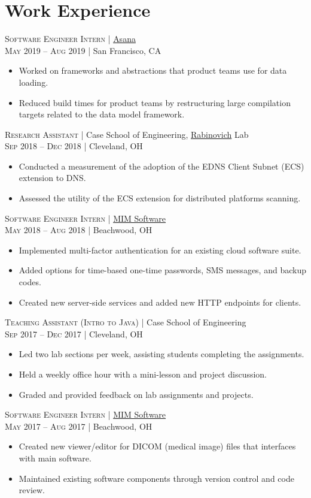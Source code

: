 \documentclass[a4paper,11pt]{article}
\begin{document}
\section{Work Experience}
\textsc{Software Engineer Intern} | \href{https://asana.com}{Asana} \\
\textsc{May 2019 – Aug 2019} | San Francisco, CA
\begin{itemize}
	\item Worked on frameworks and abstractions that product teams use for data loading.
	\item Reduced build times for product teams by restructuring large compilation targets related to the data model framework.
\end{itemize}
\vskip 2mm
\textsc{Research Assistant} | Case School of Engineering, \href{http://engr.case.edu/rabinovich_michael/}{Rabinovich} Lab \\
\textsc{Sep 2018 – Dec 2018} | Cleveland, OH
\begin{itemize}
	\item Conducted a measurement of the adoption of the EDNS Client Subnet (ECS) extension to DNS.
	\item Assessed the utility of the ECS extension for distributed platforms scanning.
\end{itemize}
\vskip 2mm
\textsc{Software Engineer Intern} | \href{https://www.mimsoftware.com}{MIM Software} \\
\textsc{May 2018 – Aug 2018} | Beachwood, OH
\begin{itemize}
	\item Implemented multi-factor authentication for an existing cloud software suite.
	\item Added options for time-based one-time passwords, SMS messages, and backup codes.
	\item Created new server-side services and added new HTTP endpoints for clients.
\end{itemize}
\vskip 2mm
\textsc{Teaching Assistant (Intro to Java)} | Case School of Engineering \\
 \textsc{Sep 2017 – Dec 2017} | Cleveland, OH
 \begin{itemize}
	 \item	Led two lab sections per week, assisting students completing the assignments.
	 \item Held a weekly office hour with a mini-lesson and project discussion.
	 \item Graded and provided feedback on lab assignments and projects.
 \end{itemize}
 \vskip 2mm
 \textsc{Software Engineer Intern} | \href{https://www.mimsoftware.com}{MIM Software} \\
 \textsc{May 2017 – Aug 2017} | Beachwood, OH
 \begin{itemize}
	\item Created new viewer/editor for DICOM (medical image) files that interfaces with main software.
	\item Maintained existing software components through version control and code review.
 \end{itemize}
\end{document}

